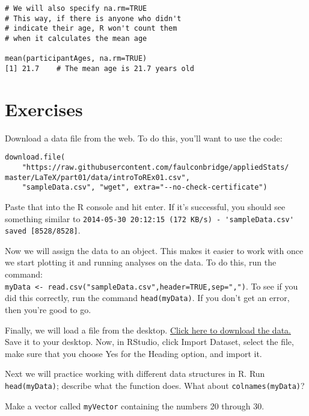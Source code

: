 \begin{framed}
\begin{Verbatim}[samepage=TRUE]
# We will also specify na.rm=TRUE
# This way, if there is anyone who didn't
# indicate their age, R won't count them
# when it calculates the mean age

mean(participantAges, na.rm=TRUE)
[1] 21.7    # The mean age is 21.7 years old
\end{Verbatim}
\end{framed}

\section{Exercises}
\prob Download a data file from the web. To do this, you'll want to use the code:
\begin{framed}
\begin{Verbatim}[samepage=TRUE]
download.file(
    "https://raw.githubusercontent.com/faulconbridge/appliedStats/
master/LaTeX/part01/data/introToREx01.csv",
    "sampleData.csv", "wget", extra="--no-check-certificate")
\end{Verbatim}
\end{framed}
Paste that into the R console and hit enter. If it's successful, you should see something similar to \verb|2014-05-30 20:12:15 (172 KB/s) - 'sampleData.csv' saved [8528/8528]|.

\prob Now we will assign the data to an object. This makes it easier to work with once we start plotting it and running analyses on the data. To do this, run the command: \\\verb|myData <- read.csv("sampleData.csv",header=TRUE,sep=",")|. To see if you did this correctly, run the command \verb|head(myData)|. If you don't get an error, then you're good to go.

\prob Finally, we will load a file from the desktop. \href{https://raw.githubusercontent.com/faulconbridge/appliedStats/master/LaTeX/part01/data/introToREx01.csv}{Click here to download the data.} Save it to your desktop. Now, in RStudio, click Import Dataset, select the file, make sure that you choose Yes for the Heading option, and import it.

\prob Next we will practice working with different data structures in R. Run \verb|head(myData)|; describe what the function does. What about \verb|colnames(myData)|?

\prob Make a vector called \verb|myVector| containing the numbers 20 through 30.

